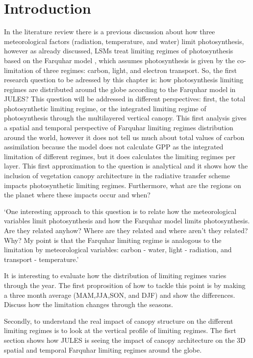 \section{Introduction}\label{introduction}

In the literature review there is a previous discussion about how three meteorological factors (radiation, temperature, and water) limit photosynthesis, however as already discussed, LSMs treat limiting regimes of photosynthesis based on the Farquhar model \citep{Farquhar1980}, which assumes photosynthesis is given by the co-limitation of three regimes: carbon, light, and electron transport. So, the first research question to be adressed by this chapter is: how photosynthesis limiting regimes are distributed around the globe according to the Farquhar model in JULES? This question will be addressed in different perspectives: first, the total photosynthetic limiting regime, or the integrated limiting regime of photosynthesis through the multilayered vertical canopy. This first analysis gives a spatial and temporal perspective of Farquhar limiting regimes distribution around the world, however it does not tell us much about total values of carbon assimilation because the model does not calculate GPP as the integrated limitation of different regimes, but it does calculates the limiting regimes per layer. This first approximation to the question is analytical and it shows how the inclusion of vegetation canopy architecture in the radiative transfer scheme impacts photosynthetic limiting regimes. Furthermore, what are the regions on the planet where these impacts occur and when?

`One interesting approach to this question is to relate how the meteorological variables limit photosynthesis and how the Farquhar model limits photosynthesis. Are they related anyhow? Where are they related and where aren't they related? Why? My point is that the Farquhar limiting regime is analogous to the limitation by meteorological variables: carbon - water, light - radiation, and transport - temperature.'

It is interesting to evaluate how the distribution of limiting regimes varies through the year. The first proprosition of how to tackle this point is by making a three month average (MAM,JJA,SON, and DJF) and show the differences. Discuss how the limitation changes through the seasons. 

Secondly, to understand the real impact of canopy structure on the different limiting regimes is to look at the vertical profile of limiting regimes. The fisrt section shows how JULES is seeing the impact of canopy architecture on the 3D spatial and temporal Farquhar limiting regimes around the globe.

